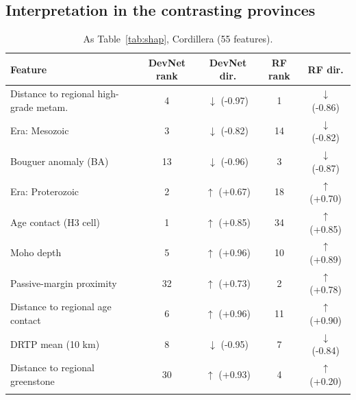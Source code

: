 \documentclass[pdflatex,sn-apa]{sn-jnl}
\begin{document}
\begin{appendices}
\clearpage
\section{Interpretation in the contrasting provinces}\label{app:shap}

\begin{table}[!h]
\caption{As Table~\ref{tab:shap}, Cordillera (55 features).}\label{tab:shap-cord}
\footnotesize
\begin{tabular*}{\textwidth}{@{\extracolsep\fill}lcccc}
\toprule
Feature & DevNet rank & DevNet dir. & RF rank & RF dir. \\
\midrule
Distance to regional high-grade metam. & 4 & $\downarrow$ (-0.97) & 1 & $\downarrow$ (-0.86) \\
Era: Mesozoic & 3 & $\downarrow$ (-0.82) & 14 & $\downarrow$ (-0.82) \\
Bouguer anomaly (BA) & 13 & $\downarrow$ (-0.96) & 3 & $\downarrow$ (-0.87) \\
Era: Proterozoic & 2 & $\uparrow$ (+0.67) & 18 & $\uparrow$ (+0.70) \\
Age contact (H3 cell) & 1 & $\uparrow$ (+0.85) & 34 & $\uparrow$ (+0.85) \\
Moho depth & 5 & $\uparrow$ (+0.96) & 10 & $\uparrow$ (+0.89) \\
Passive-margin proximity & 32 & $\uparrow$ (+0.73) & 2 & $\uparrow$ (+0.78) \\
Distance to regional age contact & 6 & $\uparrow$ (+0.96) & 11 & $\uparrow$ (+0.90) \\
DRTP mean (10 km) & 8 & $\downarrow$ (-0.95) & 7 & $\downarrow$ (-0.84) \\
Distance to regional greenstone & 30 & $\uparrow$ (+0.93) & 4 & $\uparrow$ (+0.20) \\
\botrule
\end{tabular*}
\end{table}


\end{appendices}
\end{document}
